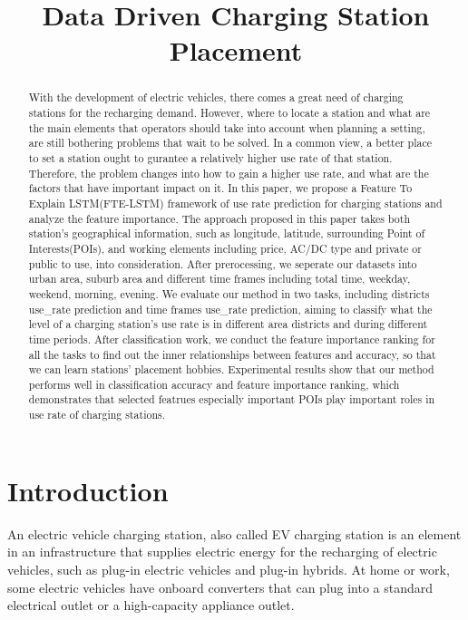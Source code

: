\documentclass[runningheads]{llncs}
\begin{document}
%
\title{Data Driven Charging Station Placement}
%
%
%
\maketitle              %
%
\begin{abstract}
With the development of electric vehicles, there comes a great need of charging stations for the recharging demand. However, where to locate a station and what are the main elements that operators should take into account when planning a setting, are still bothering problems that wait to be solved. In a common view, a better place to set a station ought to gurantee a relatively higher use rate of that station. Therefore, the problem changes into how to gain a higher use rate, and what are the factors that have important impact on it. In this paper, we propose a Feature To Explain LSTM(FTE-LSTM) framework of use rate prediction for charging stations and analyze the feature importance. The approach proposed in this paper takes both station's geographical information, such as longitude, latitude, surrounding Point of Interests(POIs), and working elements including price, AC/DC type and private or public to use, into consideration. After prerocessing, we seperate our datasets into urban area, suburb area and different time frames including total time, weekday, weekend, morning, evening. We evaluate our method in two tasks, including districts use\_rate prediction and time frames use\_rate prediction, aiming to classify what the level of a charging station's use rate is in different area districts and during different time periods. After classification work, we conduct the feature importance ranking for all the tasks to find out the inner relationships between features and accuracy, so that we can learn stations' placement hobbies. Experimental results show that our method performs well in classification accuracy and feature importance ranking, which demonstrates that selected featrues especially important POIs play important roles in use rate of charging stations.

\end{abstract}
%
%
%
\section{Introduction}
An electric vehicle charging station, also called EV charging station is an element in an infrastructure that supplies electric energy for the recharging of electric vehicles, such as plug-in electric vehicles and plug-in hybrids. At home or work, some electric vehicles have onboard converters that can plug into a standard electrical outlet or a high-capacity appliance outlet. 
\end{document}
